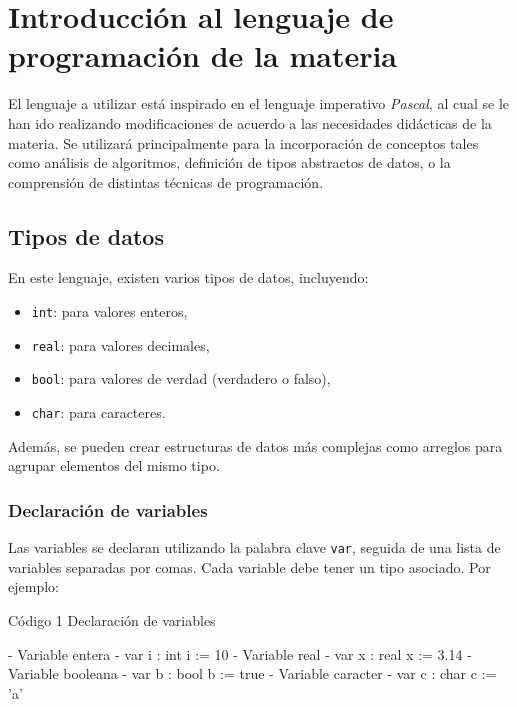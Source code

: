 \chapter{Introducción al lenguaje de programación de la materia}

El lenguaje a utilizar está inspirado en el lenguaje imperativo \textit{Pascal}, al cual se le han ido realizando modificaciones de acuerdo a las necesidades didácticas de la materia. Se utilizará principalmente para la incorporación de conceptos tales como análisis de algoritmos, definición de tipos abstractos de datos, o la comprensión de distintas técnicas de programación. 

\section{Tipos de datos}
En este lenguaje, existen varios tipos de datos, incluyendo:
\begin{itemize}
    \item \texttt{int}: para valores enteros,
    \item \texttt{real}: para valores decimales,
    \item \texttt{bool}: para valores de verdad (verdadero o falso),
    \item \texttt{char}: para caracteres.
\end{itemize}
Además, se pueden crear estructuras de datos más complejas como arreglos para agrupar elementos del mismo tipo.

\subsection{Declaración de variables}
Las variables se declaran utilizando la palabra clave \texttt{var}, seguida de una lista de variables separadas por comas. Cada variable debe tener un tipo asociado. Por ejemplo:

\begin{codebox}{Código 1}
\footnotesize Declaración de variables
\tcblower
\begin{pascallike}
    {- Variable entera -}
    var i : int
    i := 10
    {- Variable real -}
    var x : real
    x := 3.14
    {- Variable booleana -}
    var b : bool
    b := true
    {- Variable caracter -}
    var c : char
    c := 'a'
\end{pascallike}
\end{codebox}

